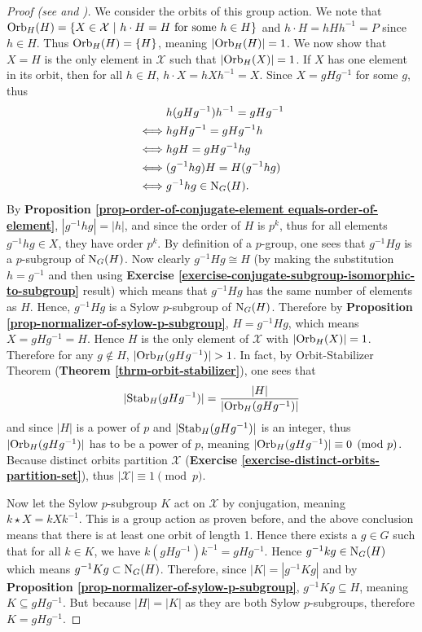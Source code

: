 \begin{proof}[Proof (see {\cite[Theorem 11.10]{humphreys_1996}} and {\cite[pp.~3--5]{mann_2011}})]
    We consider the orbits of this group action. We note that $\mathrm{Orb}_{H}(H) = \{X \in \mathcal{X} \ | \  h \cdot H = H \text{ for some } h \in H\}$ and $h\cdot H = hHh^{-1} = P$ since $h \in H$. Thus $\mathrm{Orb}_{H}(H) = \{H\}$, meaning $|\mathrm{Orb}_{H}(H)| = 1$. We now show that $X = H$ is the only element in $\mathcal{X}$ such that $|\mathrm{Orb}_{H}(X)| = 1$. If $X$ has one element in its orbit, then for all $h \in H$, $h\cdot X = hXh^{-1} = X$. Since $X = gHg^{-1}$ for some $g$, thus
    \begin{align*}
        &h(gHg^{-1})h^{-1} = gHg^{-1}\\
        \iff&hgHg^{-1} = gHg^{-1}h\\
        \iff&hgH = gHg^{-1}hg\\
        \iff&(g^{-1}hg)H = H(g^{-1}hg)\\
        \iff&g^{-1}hg \in \mathrm{N}_{G}(H).
    \end{align*}
    By \textbf{Proposition \ref{prop-order-of-conjugate-element equals-order-of-element}}, $|g^{-1}hg| = |h|$, and since the order of $H$ is $p^k$, thus for all elements $g^{-1}hg \in X$, they have order $p^k$. By definition of a $p$-group, one sees that $g^{-1}Hg$ is a $p$-subgroup of $\mathrm{N}_{G}(H)$. Now clearly $g^{-1}Hg \cong H$ (by making the substitution $h = g^{-1}$ and then using \textbf{Exercise \ref{exercise-conjugate-subgroup-isomorphic-to-subgroup}} result) which means that $g^{-1}Hg$ has the same number of elements as $H$. Hence, $g^{-1}Hg$ is a Sylow $p$-subgroup of $\mathrm{N}_{G}(H)$. Therefore by \textbf{Proposition \ref{prop-normalizer-of-sylow-p-subgroup}},  $H = g^{-1}Hg$, which means $X = gHg^{-1} = H$. Hence $H$ is the only element of $\mathcal{X}$ with $|\mathrm{Orb}_{H}(X)| = 1$. Therefore for any $g \notin H$, $|\mathrm{Orb}_{H}(gHg^{-1})| > 1$. In fact, by Orbit-Stabilizer Theorem (\textbf{Theorem \ref{thrm-orbit-stabilizer}}), one sees that
    \[
        |\mathrm{Stab}_{H}(gHg^{-1})| = \frac{|H|}{|\mathrm{Orb}_{H}(gHg^{-1})|}
    \]
    and since $|H|$ is a power of $p$ and $|\mathrm{Stab}_{H}(gHg^{-1})|$ is an integer, thus $|\mathrm{Orb}_{H}(gHg^{-1})|$ has to be a power of $p$, meaning $|\mathrm{Orb}_{H}(gHg^{-1})| \equiv 0 \pmod p$. Because distinct orbits partition $\mathcal{X}$ (\textbf{Exercise \ref{exercise-distinct-orbits-partition-set}}), thus $|\mathcal{X}| \equiv 1 \pmod p$.

    Now let the Sylow $p$-subgroup $K$ act on $\mathcal{X}$ by conjugation, meaning $k \star X = kXk^{-1}$. This is a group action as proven before, and the above conclusion means that there is at least one orbit of length 1. Hence there exists a $g \in G$ such that for all $k \in K$, we have $k(gHg^{-1})k^{-1} = gHg^{-1}$. Hence $g^{-1}kg \in \mathrm{N}_{G}(H)$ which means $g^{-1}Kg \subset \mathrm{N}_{G}(H)$. Therefore, since $|K| = |g^{-1}Kg|$ and by \textbf{Proposition \ref{prop-normalizer-of-sylow-p-subgroup}}, $g^{-1}Kg \subseteq H$, meaning $K \subseteq gHg^{-1}$. But because $|H| = |K|$ as they are both Sylow $p$-subgroups, therefore $K = gHg^{-1}$.
\end{proof}
